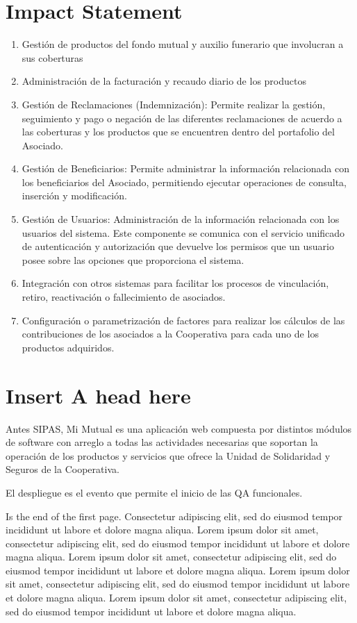 \documentclass[
  journal=large,
  manuscript=propuesta,
  year=2020,
  volume=37,
]{cup-journal}
\def\tightlist{}
\begin{document}
\section*{Impact Statement}
\begin{enumerate}
\def\labelenumi{\arabic{enumi}.}
\tightlist
\item
  Gestión de productos del fondo mutual y auxilio funerario que
  involucran a sus coberturas
\item
  Administración de la facturación y recaudo diario de los productos
\item
  Gestión de Reclamaciones (Indemnización): Permite realizar la gestión,
  seguimiento y pago o negación de las diferentes reclamaciones de
  acuerdo a las coberturas y los productos que se encuentren dentro del
  portafolio del Asociado.
\item
  Gestión de Beneficiarios: Permite administrar la información
  relacionada con los beneficiarios del Asociado, permitiendo ejecutar
  operaciones de consulta, inserción y modificación.
\item
  Gestión de Usuarios: Administración de la información relacionada con
  los usuarios del sistema. Este componente se comunica con el servicio
  unificado de autenticación y autorización que devuelve los permisos
  que un usuario posee sobre las opciones que proporciona el sistema.
\item
  Integración con otros sistemas para facilitar los procesos de
  vinculación, retiro, reactivación o fallecimiento de asociados.
\item
  Configuración o parametrización de factores para realizar los cálculos
  de las contribuciones de los asociados a la Cooperativa para cada uno
  de los productos adquiridos.
\end{enumerate}

\section{Insert A head here}
Antes SIPAS, Mi Mutual es una aplicación web compuesta por distintos
módulos de software con arreglo a todas las actividades necesarias que
soportan la operación de los productos y servicios que ofrece la Unidad
de Solidaridad y Seguros de la Cooperativa.

El despliegue es el evento que permite el inicio de las QA funcionales.

\CUPTWOCOL 
Is the end of the first page. Consectetur adipiscing elit, sed do eiusmod tempor incididunt ut labore et dolore magna aliqua. Lorem ipsum dolor sit amet, consectetur adipiscing elit, sed do eiusmod tempor incididunt ut labore et dolore magna aliqua. Lorem ipsum dolor sit amet, consectetur adipiscing elit, sed do eiusmod tempor incididunt ut labore et dolore magna aliqua. Lorem ipsum dolor sit amet, consectetur adipiscing elit, sed do eiusmod tempor incididunt ut labore et dolore magna aliqua. Lorem ipsum dolor sit amet, consectetur adipiscing elit, sed do eiusmod tempor incididunt ut labore et dolore magna aliqua. 
\end{document}
